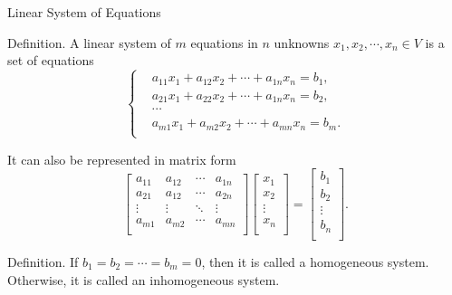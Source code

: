 \documentclass[11pt,aspectratio=169]{beamer}
\begin{document}
    \begin{frame}[t]{Linear System of Equations}
        \par \textcolor{yy}{Definition.} A \textcolor{yy}{linear system} of $m$ equations in $n$ unknowns $x_1,x_2,\cdots,x_n \in V$ is a set of equations 
        \begin{equation*}
            \left\{ 
                \begin{aligned}
                    & a_{11}x_{1} + a_{12}x_{2} + \cdots + a_{1 n}x_n = b_1, \\
                    & a_{21}x_{1} + a_{22}x_{2} + \cdots + a_{1 n}x_n = b_2, \\
                    & \cdots \\
                    & a_{m1}x_{1} + a_{m2}x_{2} + \cdots + a_{m n}x_n = b_m. \\
                \end{aligned}
            \right.
        \end{equation*}
        \par It can also be represented in matrix form 
        \begin{equation*}
            \left[ 
                \begin{array}{cccc}
                    a_{11} & a_{12} & \cdots & a_{1n} \\ 
                    a_{21} & a_{12} & \cdots & a_{2n} \\ 
                    \vdots & \vdots & \ddots & \vdots \\ 
                    a_{m1} & a_{m2} & \cdots & a_{mn} \\
                \end{array}
            \right] \left[
                \begin{array}{c} 
                    x_{1} \\
                    x_{2} \\
                    \vdots \\
                    x_{n} \\ 
                \end{array}
            \right] = \left[ 
                \begin{array}{c} 
                    b_{1} \\
                    b_{2} \\
                    \vdots \\
                    b_{n} \\
                \end{array}
            \right].
        \end{equation*}
        
        \par \textcolor{yy}{Definition.} If $b_1 = b_2 = \cdots = b_m = 0$, then it is called a \textcolor{yy}{homogeneous system}. Otherwise, it is called an \textcolor{yy}{inhomogeneous system}. 
    \end{frame}
\end{document}
